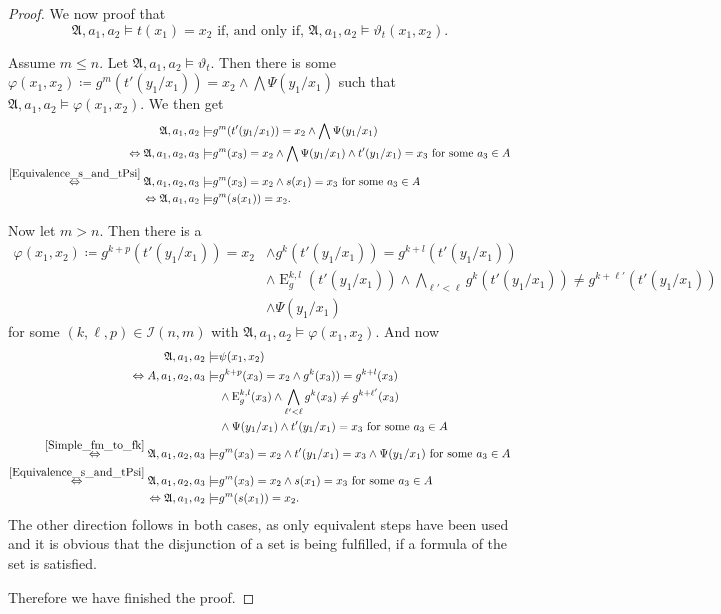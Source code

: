 \documentclass[a4paper,11pt,DIV=15]{scrartcl} %
\renewcommand{\phi}{\varphi}
\theoremstyle{plain}
\theoremstyle{definition}
\renewcommand{\theta}{\vartheta}
\begin{document}
\begin{proof}
	We now proof that 
	$$\mathfrak A, a_1,a_2\models t(x_1)=x_2 \text{ if, and only if, } \mathfrak A,a_1,a_2\models \theta_{t}(x_1,x_2).$$
	
	Assume $m\leq n$.
	Let $\mathfrak A, a_1,a_2 \models \theta_{t}$.
	Then there is some $\phi(x_1,x_2)\coloneqq g^{m}(t'(y_1/x_1))=x_2 \land \bigwedge \Psi(y_1/x_1)$ such that $\mathfrak A,a_1,a_2\models \phi(x_1,x_2)$.
	We then get
	\begin{align*}
		\mathfrak A,a_1,a_2 \models & g^{m}(t'(y_1/x_1))=x_2 \land \bigwedge \Psi(y_1/x_1) \\
		\Leftrightarrow \mathfrak A,a_1,a_2,a_3 \models & g^{m}(x_3)=x_2 \land \bigwedge \Psi(y_1/x_1) \land t'(y_1/x_1)=x_3 \text{ for some } a_3\in A \\
		\overset{\cref{Equivalence_s_and_tPsi}}{\Leftrightarrow} \mathfrak A,a_1,a_2,a_3\models & g^{m}(x_3)=x_2 \land s(x_1)=x_3 \text{ for some } a_3\in A \\
		\Leftrightarrow \mathfrak A,a_1,a_2 \models & g^{m}(s(x_1))=x_2.
	\end{align*}
	
	Now let $m>n$.
	Then there is a
	\begin{align*}
		\phi(x_1,x_2)\coloneqq g^{k+p}(t'(y_1/x_1))=x_2 &\land g^{k}(t'(y_1/x_1))=g^{k+l}(t'(y_1/x_1)) \\
		& \land \operatorname{E}^{k,l}_g(t'(y_1/x_1)) \land \bigwedge_{\ell'<\ell} g^{k}(t'(y_1/x_1))\neq g^{k+\ell'}(t'(y_1/x_1)) \\
		& \land \Psi(y_1/x_1)
	\end{align*}
	for some $(k,\ell,p)\in\mathcal I(n,m)$ with $\mathfrak A,a_1,a_2\models \phi(x_1,x_2)$.
	And now
	\begin{align*}
		\mathfrak A,a_1,a_2 \models & \psi(x_1,x_2) \\
		\Leftrightarrow A,a_1,a_2,a_3 \models &g^{k+p}(x_3)=x_2 \land g^{k}(x_3))=g^{k+l}(x_3) \\
			& \land \operatorname{E}^{k,l}_g(x_3) \land \bigwedge_{\ell'<\ell} g^{k}(x_3)\neq g^{k+\ell'}(x_3) \\
			& \land \Psi(y_1/x_1) \land t'(y_1/x_1)=x_3 \text{ for some } a_3\in A \\
		\overset{\cref{Simple_fm_to_fk}}{\Leftrightarrow} \mathfrak A, a_1,a_2,a_3 \models & g^{m}(x_3)=x_2 \land t'(y_1/x_1)=x_3 \land \Psi(y_1/x_1) \text{ for some } a_3 \in A \\
		\overset{\cref{Equivalence_s_and_tPsi}}{\Leftrightarrow} \mathfrak A,a_1,a_2,a_3 \models & g^{m}(x_3)=x_2\land s(x_1)=x_3 \text{ for some } a_3\in A \\
		\Leftrightarrow \mathfrak A,a_1,a_2 \models & g^{m}(s(x_1))=x_2.
	\end{align*}
	The other direction follows in both cases, as only equivalent steps have been used and it is obvious that the disjunction of a set is being fulfilled, if a formula of the set is satisfied.
	
	Therefore we have finished the proof.
\end{proof}
\end{document}
